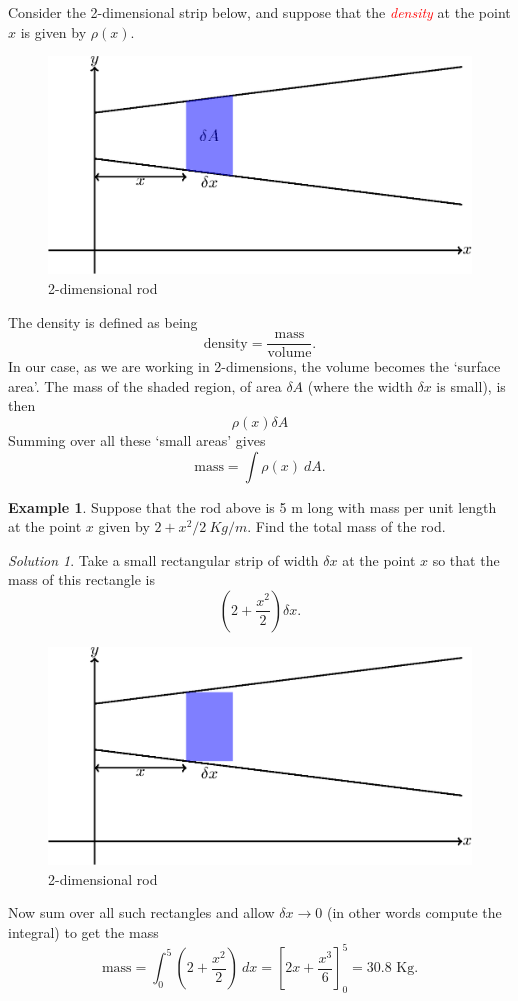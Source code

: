\documentclass[
  11pt,
  oneside]{book}
\newcommand{\slide}{}
\theoremstyle{definition}
\theoremstyle{definition}
\newtheorem{example}{Example}[chapter]
\theoremstyle{definition}
\theoremstyle{definition}
\theoremstyle{remark}
\newtheorem*{solution}{Solution}
\begin{document}
Consider the 2-dimensional strip below, and suppose that the \textcolor{red}{\em density} at the point \(x\) is given by \(\rho(x)\).

\begin{figure}

{\centering \includegraphics[width=0.5\linewidth]{tikztopng-figure37} 

}

\caption{2-dimensional rod}\label{fig:fig37}
\end{figure}
\slide

The density is defined as being
\[
\text{density} = \frac{\text{mass}}{\text{volume}}.
\]
In our case, as we are working in 2-dimensions, the volume becomes the `surface area'. The mass of the shaded region, of area \(\delta A\) (where the width \(\delta x\) is small), is then
\[
\rho(x)\delta A
\]
Summing over all these `small areas' gives
\[
\text{mass} = \int\rho(x)\ dA.
\]
\slide

\begin{example}
Suppose that the rod above is 5 m long with mass per unit length at the point \(x\) given by \(2+x^2/2\ Kg/m\). Find the total mass of the rod.
\end{example}

\begin{solution}
\leavevmode

Take a small rectangular strip of width \(\delta x\) at the point \(x\) so that the mass of this rectangle is
\[
\left(2+\frac{x^2}2\right)\delta x.
\]

\begin{figure}

{\centering \includegraphics[width=0.5\linewidth]{tikztopng-figure38} 

}

\caption{2-dimensional rod}\label{fig:fig38}
\end{figure}

Now sum over all such rectangles and allow \(\delta x \to 0\) (in other words compute the integral) to get the mass
\[
\text{mass} = \int_0^5\left(2+\frac{x^2}{2}\right)\ dx = \left[2x+\frac{x^3}{6}\right]_0^5 = 30.8\text{ Kg}.
\]

\end{solution}
\end{document}
